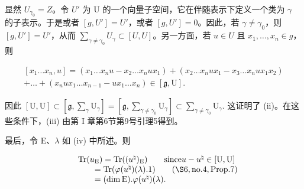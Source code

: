 显然 \(U_{\gamma_{0}} = Z\)。令 \(U'\) 为 U 的一个向量子空间，它在伴随表示下定义一个类为 \(\gamma\) 的子表示。于是或者 \([g, U'] = U'\)，或者 \([g, U'] = 0\)。因此，若 \(\gamma \neq \gamma_{0}\)，则 \([g, U'] = U'\)，从而 \(\sum_{\gamma \neq \gamma_{0}} U_{\gamma} \subset [U, U]\)。另一方面，若 \(u \in U\) 且 \(x_{1}, \ldots, x_{n} \in g\)，则

\[
\begin{array}{c} [ x _ {1} \ldots x _ {n}, u ] = (x _ {1} \ldots x _ {n} u - x _ {2} \ldots x _ {n} u x _ {1}) + (x _ {2} \ldots x _ {n} u x _ {1} - x _ {3} \ldots x _ {n} u x _ {1} x _ {2}) \\ + \dots + (x _ {n} u x _ {1} \ldots x _ {n - 1} - u x _ {1} \ldots x _ {n}) \in [ \mathfrak {g}, \mathrm{U} ]. \end{array}
\]

因此 \([\mathrm{U},\mathrm{U}]\subset \left[\mathfrak{g},\sum_{\gamma}\mathrm{U}_{\gamma}\right] = \left[\mathfrak{g},\sum_{\gamma \neq \gamma_0}\mathrm{U}_\gamma \right]\subset \sum_{\gamma \neq \gamma_0}\mathrm{U}_\gamma .\) 这证明了 (ii)。在这些条件下，(iii) 由第 I 章第6节第9号引理5得到。

最后，令 E、\(\lambda\) 如 (iv) 中所述。则

\[
\begin{array}{r l} & {\mathrm{Tr} (u _ {\mathrm{E}}) = \mathrm{Tr} ((u ^ {\natural}) _ {\mathrm{E}}) \qquad \text {since} u - u ^ {\natural} \in [ \mathrm{U}, \mathrm{U} ]} \\ & {\qquad = \mathrm{Tr} (\varphi (u ^ {\natural}) (\lambda). 1) \qquad (\S 6, \text {no.} 4, \text {Prop.} 7)} \\ & {\qquad = (\dim \mathrm{E}). \varphi (u ^ {\natural}) (\lambda).} \end{array}
\]

